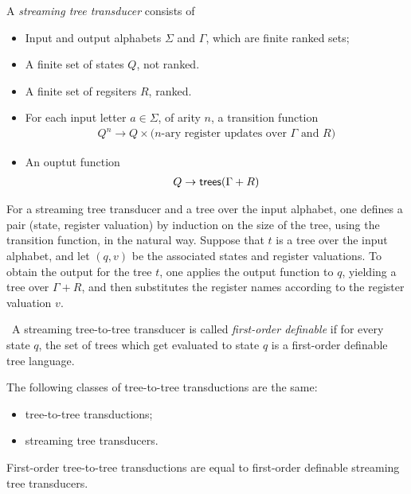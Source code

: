 \begin{definition}
    A \emph{streaming tree transducer} consists of 
\begin{itemize}
    \item Input and output alphabets $\Sigma$ and $\Gamma$, which are finite ranked sets;
    \item A finite set of states $Q$, not ranked.
    \item A finite set of regsiters $R$, ranked.
    \item For each input letter $a \in \Sigma$, of arity $n$, a transition function
 \begin{align*}
     Q^n \to Q \times \text{($n$-ary register updates over $\Gamma$ and $R$)}
 \end{align*}
 \item An ouptut function
 \begin{align*}
     Q \to \mathsf {trees}(\Gamma + R)
 \end{align*}
\end{itemize}
\end{definition}

For a streaming tree transducer and a tree over the input alphabet, one defines a pair (state, register valuation)
by induction on the size of the tree, using the transition function, in the natural way. Suppose that $t$  is a tree over the input alphabet, and let $(q,v)$ be the associated states and register  valuations. To obtain the output for the tree $t$, one applies the output function to $q$, yielding a tree over $\Gamma + R$, and then substitutes the register names according to the register valuation $v$. 


\begin{definition}\ 
    A streaming tree-to-tree transducer is called \emph{first-order definable} if for every state $q$, the set of trees which get evaluated to state $q$ is a first-order definable tree language.
\end{definition}    
\begin{theorem}\label{thm:sst}
    The following classes of tree-to-tree transductions are the same:
    \begin{itemize}
        \item  \mso tree-to-tree transductions;
        \item streaming tree transducers.
    \end{itemize}
    First-order  tree-to-tree transductions are equal to first-order definable streaming tree transducers.
\end{theorem}

